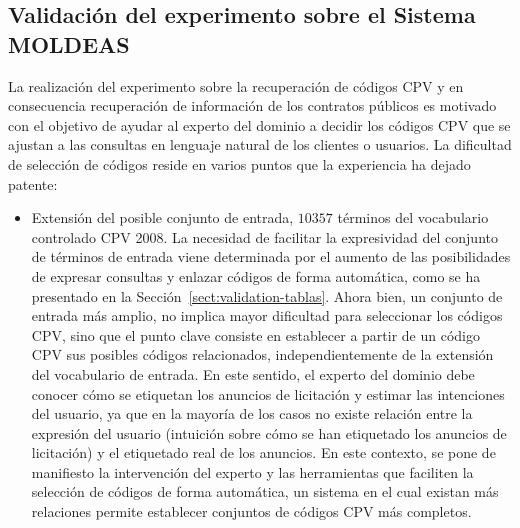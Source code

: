 \subsection{Validación del experimento sobre el Sistema MOLDEAS}
La realización del experimento sobre la recuperación de códigos \gls{CPV} y en consecuencia recuperación 
de información de los contratos públicos es motivado con el objetivo de ayudar al experto del dominio 
a decidir los códigos CPV que se ajustan a las consultas en lenguaje natural de los clientes o 
usuarios. La dificultad de selección de códigos reside en varios puntos que la experiencia ha 
dejado patente:
\begin{itemize}
 \item Extensión del posible conjunto de entrada, $10357$ términos del vocabulario controlado CPV 2008. La necesidad de 
facilitar la expresividad del conjunto de términos de entrada viene determinada por el aumento de las posibilidades 
de expresar consultas y enlazar códigos de forma automática, como se ha presentado en la Sección~\ref{sect:validation-tablas}. Ahora 
bien, un conjunto de entrada más amplio, no implica mayor dificultad para seleccionar los códigos CPV, sino que el punto 
clave consiste en establecer a partir de un código CPV sus posibles códigos relacionados, independientemente 
de la extensión del vocabulario de entrada. En este sentido, el experto del dominio debe conocer cómo se etiquetan 
los anuncios de licitación y estimar las intenciones del usuario, ya que en la mayoría de los casos no existe relación 
entre la expresión del usuario (intuición sobre cómo se han etiquetado los anuncios de licitación) y el etiquetado 
real de los anuncios. En este contexto, se pone de manifiesto la intervención del experto y las herramientas 
que faciliten la selección de códigos de forma automática, un sistema en el cual existan más relaciones permite 
establecer conjuntos de códigos CPV más completos.


\end{itemize}
